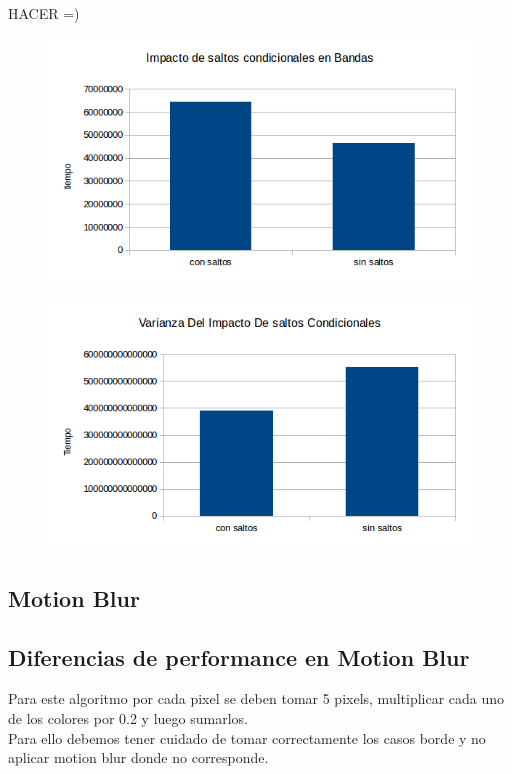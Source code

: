 \documentclass[a4paper]{article}
\begin{document}
HACER =)

\begin{figure}[h!]
  \begin{center}
  \includegraphics[scale=0.66]{Graficos3.1/per.png}
  \label{nombreparareferenciar1}
  \end{center}
\end{figure}

\begin{figure}[h!]
  \begin{center}
  \includegraphics[scale=0.66]{Graficos3.1/var.png}
  \label{nombreparareferenciar1}
  \end{center}
\end{figure}

\newpage
\subsection{Motion Blur}
\subsection{Diferencias de performance en Motion Blur}
Para este algoritmo por cada pixel se deben tomar 5 pixels, multiplicar cada uno de los colores por 0.2 y luego sumarlos.
\\
Para ello debemos tener cuidado de tomar correctamente los casos borde y no aplicar motion blur donde no corresponde.
\end{document}

